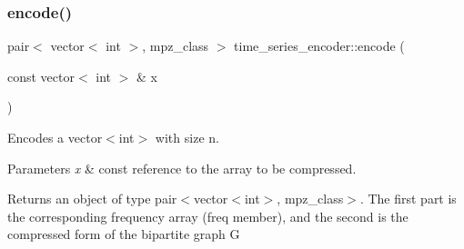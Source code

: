 \subsubsection{\texorpdfstring{encode()}{encode()}}
{\footnotesize\ttfamily pair$<$ vector$<$ int $>$, mpz\+\_\+class $>$ time\+\_\+series\+\_\+encoder\+::encode (\begin{DoxyParamCaption}\item[{const vector$<$ int $>$ \&}]{x }\end{DoxyParamCaption})}



Encodes a {\ttfamily vector$<$int$>$} with size n. 


\begin{DoxyParams}{Parameters}
{\em x} & const reference to the array to be compressed. \\
\hline
\end{DoxyParams}
\begin{DoxyReturn}{Returns}
an object of type {\ttfamily pair$<$vector$<$int$>$, mpz\+\_\+class$>$}. The first part is the corresponding frequency array ({\ttfamily freq} member), and the second is the compressed form of the bipartite graph G 
\end{DoxyReturn}

